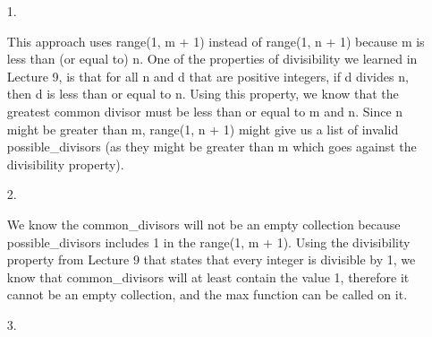 \documentclass[11pt]{article}
\begin{document}
\begin{enumerate}
\item[1.]

This approach uses range(1, m + 1) instead of range(1, n + 1) because m is less than (or equal to) n. One of the properties of divisibility we learned in Lecture 9, is that for all n and d that are positive integers, if d divides n, then d is less than or equal to n. Using this property, we know that the greatest common divisor must be less than or equal to m and n. Since n might be greater than m, range(1, n + 1) might give us a list of invalid possible\_divisors (as they might be greater than m which goes against the divisibility property).

\item[2.]

We know the common\_divisors will not be an empty collection because possible\_divisors includes 1 in the range(1,  m + 1). Using the divisibility property from Lecture 9 that states that every integer is divisible by 1, we know that common\_divisors will at least contain the value 1, therefore it cannot be an empty collection, and the max function can be called on it.

\item[3.]


\end{enumerate}
\end{document}
